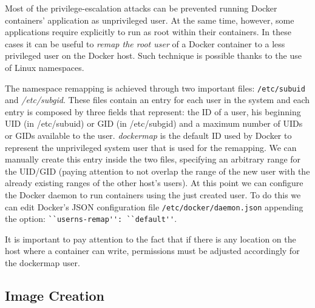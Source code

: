 \documentclass[a4paper,12pt]{article}
\newcommand{\file}[1]{\texttt{#1}\xspace}
\newcommand{\code}[1]{\lstinline|#1|}
\begin{document}
Most of the privilege-escalation attacks can be prevented running Docker
containers' application as unprivileged user. At the same time, however, some
applications require explicitly to run as root within their containers. In these
cases it can be useful to \textit{remap the root user} \cite{isolate_namespace}
of a Docker container to a less privileged user on the Docker host. Such
technique is possible thanks to the use of Linux namespaces. \par The namespace
remapping is achieved through two important files: \file{/etc/subuid} and
\textit{/etc/subgid}. These files contain an entry for each user in the system
and each entry is composed by three fields that represent: the ID of a user, his
beginning UID (in /etc/subuid) or GID (in /etc/subgid) and a maximum number of
UIDs or GIDs available to the user. \textit{dockermap} is the default ID used by
Docker to represent the unprivileged system user that is used for the remapping.
We can manually create this entry inside the two files, specifying an arbitrary
range for the UID/GID (paying attention to not overlap the range of the new user
with the already existing ranges of the other host's users). At this point we
can configure the Docker daemon to run containers using the just created user.
To do this we can edit Docker's JSON configuration file
\file{/etc/docker/daemon.json} appending the option: \code{``userns-remap'':
``default''}. \par It is important to pay attention to the fact that if there is any
location on the host where a container can write, permissions must be
adjusted accordingly for the dockermap user. 

\subsection{Image Creation}
\end{document}
